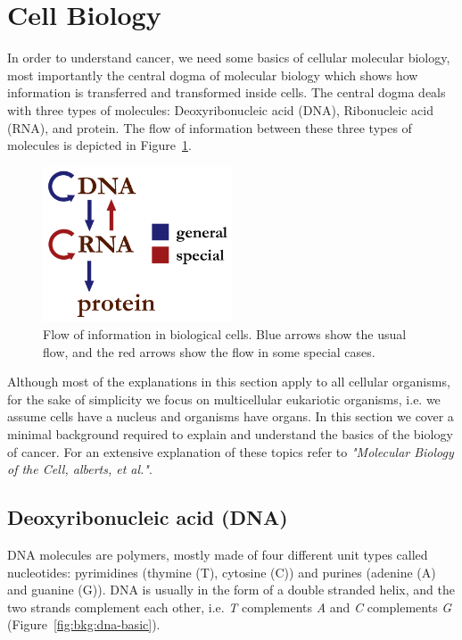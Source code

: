 \section{Cell Biology}
\label{sec:bkg:biology}
In order to understand cancer, we need some basics of cellular molecular biology, most importantly the central dogma of molecular biology which shows how information is transferred and transformed inside cells. The central dogma deals with three types of molecules: Deoxyribonucleic acid (DNA), Ribonucleic acid (RNA), and protein. The flow of information between these three types of molecules is depicted in Figure~\ref{fig:bkg:central-dogma}.

\begin{figure}[!ht]
  \centering
  \includegraphics[width=0.5\textwidth]{figs/background/Centraldogma_nodetails}
  \caption{Flow of information in biological cells. Blue arrows show the usual flow, and the red arrows show the flow in some special cases.}
  \label{fig:bkg:central-dogma}
\end{figure}

Although most of the explanations in this section apply to all cellular organisms, for the sake of simplicity we focus on multicellular eukariotic organisms, i.e. we assume cells have a nucleus and organisms have organs. In this section we cover a minimal background required to explain and understand the basics of the biology of cancer. For an extensive explanation of these topics refer to \emph{"Molecular Biology of the Cell, alberts, et al."}\cite{the-cell}.

\subsection{Deoxyribonucleic acid (DNA)}
DNA molecules are polymers, mostly made of four different unit types called nucleotides: pyrimidines (thymine (T), cytosine (C)) and purines (adenine (A) and guanine (G)). DNA is usually in the form of a double stranded helix, and the two strands complement each other, i.e. \emph{T} complements \emph{A} and \emph{C} complements \emph{G} (Figure~\ref{fig:bkg:dna-basic}).

